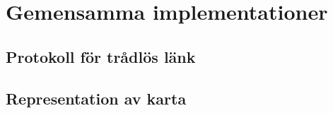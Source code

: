\documentclass[designspec/spec.tex]{subfiles}
\begin{document}
\section{Gemensamma implementationer}

\subsection{Protokoll för trådlös länk}

\subsection{Representation av karta}
\end{document}
